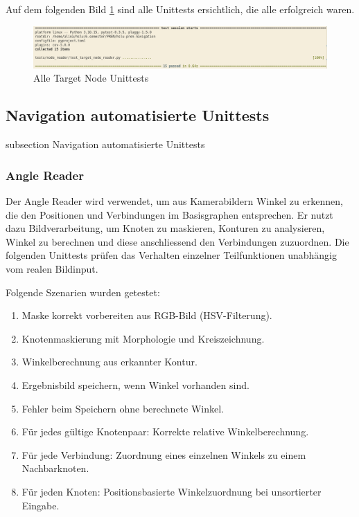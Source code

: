 \begin{table}[H]
\begin{tabularx}
  \hline
\end{tabularx}
\caption{Target Node Recognition Testprotokoll}
\label{table:target-node-test}
\end{table}



Auf dem folgenden Bild \ref{img:target_node_unittests} sind alle Unittests ersichtlich, die alle erfolgreich waren.

\begin{figure}[H]
\centering
\includegraphics[width=\textwidth]{assets/IT/testing/target_node/target_node_reader_unittests.png}
\caption{Alle Target Node Unittests}
\label{img:target_node_unittests}
\end{figure}

\newpage
\subsection*{Navigation automatisierte Unittests}\label{nav-unittests}
    {subsection}
    {Navigation automatisierte Unittests}

\subsubsection*{Angle Reader}\label{angle-reader-unittests}

Der Angle Reader wird verwendet, um aus Kamerabildern Winkel zu erkennen, die den Positionen und Verbindungen im Basisgraphen entsprechen. Er nutzt dazu Bildverarbeitung, um Knoten zu maskieren, Konturen zu analysieren, Winkel zu berechnen und diese anschliessend den Verbindungen zuzuordnen. Die folgenden Unittests prüfen das Verhalten einzelner Teilfunktionen unabhängig vom realen Bildinput.

Folgende Szenarien wurden getestet:

\begin{enumerate}
\item Maske korrekt vorbereiten aus RGB-Bild (HSV-Filterung).
\item Knotenmaskierung mit Morphologie und Kreiszeichnung.
\item Winkelberechnung aus erkannter Kontur.
\item Ergebnisbild speichern, wenn Winkel vorhanden sind.
\item Fehler beim Speichern ohne berechnete Winkel.
\item Für jedes gültige Knotenpaar: Korrekte relative Winkelberechnung.
\item Für jede Verbindung: Zuordnung eines einzelnen Winkels zu einem Nachbarknoten.
\item Für jeden Knoten: Positionsbasierte Winkelzuordnung bei unsortierter Eingabe.
\end{enumerate}

